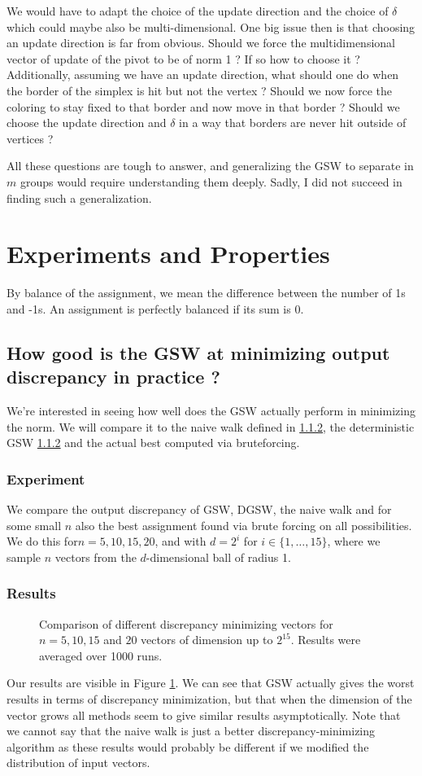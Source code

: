 \documentclass[12pt]{article}
\begin{document}
We would have to adapt the choice of the update direction and the choice of $\delta$ which could maybe also be multi-dimensional. One big issue then is that choosing an update direction is far from obvious. Should we force the multidimensional vector of update of the pivot to be of norm 1 ? If so how to choose it ? Additionally, assuming we have an update direction, what should one do when the border of the simplex is hit but not the vertex ? Should we now force the coloring to stay fixed to that border and now move in that border ? Should we choose the update direction and $\delta$ in a way that borders are never hit outside of vertices ?

All these questions are tough to answer, and generalizing the GSW to separate in $m$ groups would require understanding them deeply. Sadly, I did not succeed in finding such a generalization.

\section{Experiments and Properties}
By balance of the assignment, we mean the difference between the number of 1s and -1s. An assignment is perfectly balanced if its sum is 0.

\subsection{How good is the GSW at minimizing output discrepancy in practice ?}
We're interested in seeing how well does the GSW actually perform in minimizing the norm. We will compare it to the naive walk defined in \ref{}, the deterministic GSW \ref{} and the actual best computed via bruteforcing.

\subsubsection{Experiment}\label{how_good_at_minimizing_disc}
We compare the output discrepancy of GSW, DGSW, the naive walk and for some small $n$ also the best assignment found via brute forcing on all possibilities. We do this for$n=5,10,15,20$, and with $d=2^i$ for $i\in\{1,\dots,15\}$, where we sample $n$ vectors from the $d$-dimensional ball of radius 1.

\subsubsection{Results}
\begin{figure}
\centering

\caption{Comparison of different discrepancy minimizing vectors for $n=5,10,15$ and $20$ vectors of dimension up to $2^{15}$. Results were averaged over 1000 runs.}\label{output_disc}
\end{figure}
Our results are visible in Figure \ref{output_disc}. We can see that GSW actually gives the worst results in terms of discrepancy minimization, but that when the dimension of the vector grows all methods seem to give similar results asymptotically. Note that we cannot say that the naive walk is just a better discrepancy-minimizing algorithm as these results would probably be different if we modified the distribution of input vectors.
\end{document}
